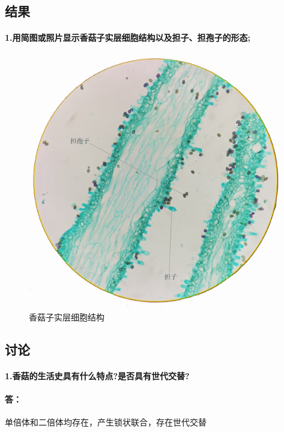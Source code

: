 \documentclass[UTF8]{ctexart}
\begin{document}
        \subsection*{结果}
            \paragraph*{1.用简图或照片显示香菇子实层细胞结构以及担子、担孢子的形态;}
            \begin{figure}[h]
                \centering
                \includegraphics[scale=0.08]{src/botany/IMG_20201118_192210.jpg}
                \caption{香菇子实层细胞结构}
            \end{figure}
            \subsection*{讨论}
            \paragraph*{1.香菇的生活史具有什么特点?是否具有世代交替?}
            \paragraph*{答：}单倍体和二倍体均存在，产生锁状联合，存在世代交替
\end{document}

